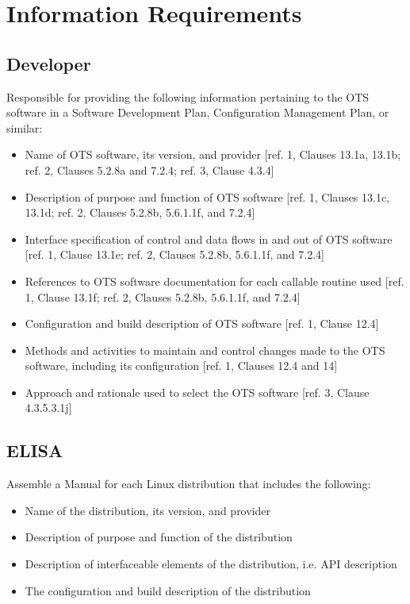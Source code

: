\documentclass[12pt]{../Common_files/ElisaPaper}
\begin{document}
\section{Information Requirements}
\subsection{Developer}
Responsible for providing the following information pertaining to the OTS software in a Software Development Plan, Configuration Management Plan, or similar:

\begin{itemize}

\item Name of OTS software, its version, and provider [ref. 1, Clauses 13.1a, 13.1b; ref. 2, Clauses 5.2.8a and 7.2.4; ref. 3, Clause 4.3.4]

\item Description of purpose and function of OTS software [ref. 1, Clauses 13.1c, 13.1d; ref. 2, Clauses 5.2.8b, 5.6.1.1f, and 7.2.4]

\item Interface specification of control and data flows in and out of OTS software [ref. 1, Clause 13.1e; ref. 2, Clauses 5.2.8b, 5.6.1.1f, and 7.2.4]

\item References to OTS software documentation for each callable routine used [ref. 1, Clause 13.1f; ref. 2, Clauses 5.2.8b, 5.6.1.1f, and 7.2.4]

\item Configuration and build description of OTS software [ref. 1, Clause 12.4]

\item Methods and activities to maintain and control changes made to the OTS software, including its configuration [ref. 1, Clauses 12.4 and 14]

\item Approach  and rationale used to select the OTS software [ref. 3, Clause 4.3.5.3.1j]

\end{itemize}

\subsection{ELISA}
Assemble a Manual for each Linux distribution that includes the following:

\begin{itemize}

\item Name of the distribution, its version, and provider

\item Description of purpose and function of the distribution 

\item Description of interfaceable elements of the distribution, i.e. API description

\item The configuration and build description of the distribution

\end{itemize}
\end{document}
